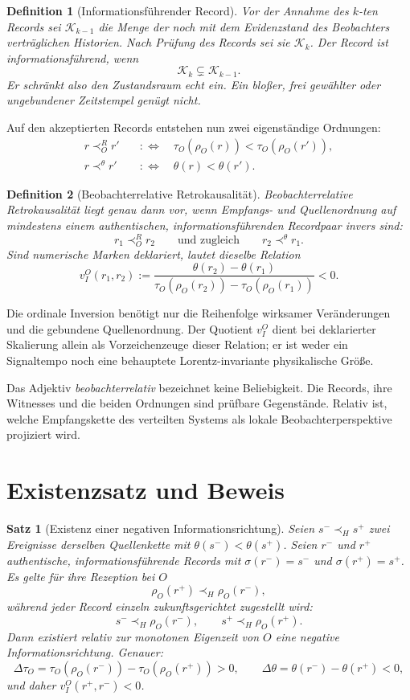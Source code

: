 \documentclass[11pt,a4paper]{article}
\newtheorem{definition}{Definition}[section]
\newtheorem{satz}{Satz}[section]
\theoremstyle{remark}
\newcommand{\host}{\prec_{\!H}}
\newcommand{\recv}{\prec_{\!O}^{R}}
\newcommand{\sourceord}{\prec^{\theta}}
\newcommand{\histories}{\mathcal{K}}
\begin{document}
\begin{definition}[Informationsführender Record]
Vor der Annahme des \(k\)-ten Records sei \(\histories_{k-1}\) die Menge der
noch mit dem Evidenzstand des Beobachters verträglichen Historien. Nach
Prüfung des Records sei sie \(\histories_k\). Der Record ist
\emph{informationsführend}, wenn
\[
  \histories_k\subsetneq\histories_{k-1}.
\]
Er schränkt also den Zustandsraum echt ein. Ein bloßer, frei gewählter oder
ungebundener Zeitstempel genügt nicht.
\end{definition}

Auf den akzeptierten Records entstehen nun zwei eigenständige Ordnungen:
\begin{align*}
  r\recv r' &\quad:\Longleftrightarrow\quad
  \tau_O(\rho_O(r))<\tau_O(\rho_O(r')),\\
  r\sourceord r' &\quad:\Longleftrightarrow\quad
  \theta(r)<\theta(r').
\end{align*}

\begin{definition}[Beobachterrelative Retrokausalität]
\label{def:retro}
Beobachterrelative Retrokausalität liegt genau dann vor, wenn Empfangs- und
Quellenordnung auf mindestens einem authentischen, informationsführenden
Recordpaar invers sind:
\[
  r_1\recv r_2
  \qquad\text{und zugleich}\qquad
  r_2\sourceord r_1.
\]
Sind numerische Marken deklariert, lautet dieselbe Relation
\[
  v_I^O(r_1,r_2)
  :=\frac{\theta(r_2)-\theta(r_1)}
          {\tau_O(\rho_O(r_2))-\tau_O(\rho_O(r_1))}<0.
\]
\end{definition}

Die ordinale Inversion benötigt nur die Reihenfolge wirksamer Veränderungen
und die gebundene Quellenordnung. Der Quotient \(v_I^O\) dient bei deklarierter
Skalierung allein als Vorzeichenzeuge dieser Relation; er ist weder ein
Signaltempo noch eine behauptete Lorentz-invariante physikalische Größe.

Das Adjektiv \emph{beobachterrelativ} bezeichnet keine Beliebigkeit. Die
Records, ihre Witnesses und die beiden Ordnungen sind prüfbare Gegenstände.
Relativ ist, welche Empfangskette des verteilten Systems als lokale
Beobachterperspektive projiziert wird.

\section{Existenzsatz und Beweis}

\begin{satz}[Existenz einer negativen Informationsrichtung]
\label{thm:existence}
Seien \(s^-\host s^+\) zwei Ereignisse derselben Quellenkette mit
\(\theta(s^-)<\theta(s^+)\). Seien \(r^-\) und \(r^+\) authentische,
informationsführende Records mit \(\sigma(r^-)=s^-\) und
\(\sigma(r^+)=s^+\). Es gelte für ihre Rezeption bei \(O\)
\[
  \rho_O(r^+)\host\rho_O(r^-),
\]
während jeder Record einzeln zukunftsgerichtet zugestellt wird:
\[
  s^-\host\rho_O(r^-),\qquad
  s^+\host\rho_O(r^+).
\]
Dann existiert relativ zur monotonen Eigenzeit von \(O\) eine negative
Informationsrichtung. Genauer:
\[
  \Delta\tau_O
  =\tau_O(\rho_O(r^-))-\tau_O(\rho_O(r^+))>0,
  \qquad
  \Delta\theta
  =\theta(r^-)-\theta(r^+)<0,
\]
und daher \(v_I^O(r^+,r^-)<0\).
\end{satz}
\end{document}
